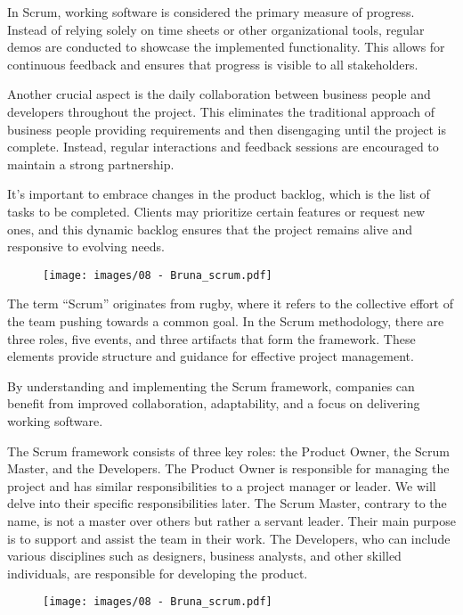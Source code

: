 In Scrum, working software is considered the primary measure of
progress. Instead of relying solely on time sheets or other
organizational tools, regular demos are conducted to showcase the
implemented functionality. This allows for continuous feedback and
ensures that progress is visible to all stakeholders.

Another crucial aspect is the daily collaboration between business
people and developers throughout the project. This eliminates the
traditional approach of business people providing requirements and then
disengaging until the project is complete. Instead, regular interactions
and feedback sessions are encouraged to maintain a strong partnership.

It's important to embrace changes in the product backlog, which is the
list of tasks to be completed. Clients may prioritize certain features
or request new ones, and this dynamic backlog ensures that the project
remains alive and responsive to evolving needs.

\begin{figure}[!h]
  \centering
  \texttt{[image: images/08 - Bruna\_scrum.pdf]}
\end{figure}

The term ``Scrum'' originates from rugby, where it refers to the
collective effort of the team pushing towards a common goal. In the
Scrum methodology, there are three roles, five events, and three
artifacts that form the framework. These elements provide structure and
guidance for effective project management.

By understanding and implementing the Scrum framework, companies can
benefit from improved collaboration, adaptability, and a focus on
delivering working software.

The Scrum framework consists of three key roles: the Product Owner, the
Scrum Master, and the Developers. The Product Owner is responsible for
managing the project and has similar responsibilities to a project
manager or leader. We will delve into their specific responsibilities
later. The Scrum Master, contrary to the name, is not a master over
others but rather a servant leader. Their main purpose is to support and
assist the team in their work. The Developers, who can include various
disciplines such as designers, business analysts, and other skilled
individuals, are responsible for developing the product.

\begin{figure}[!h]
  \centering
  \texttt{[image: images/08 - Bruna\_scrum.pdf]}
\end{figure}

